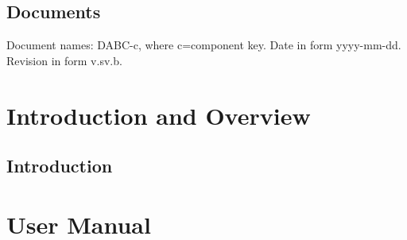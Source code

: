 \documentclass{dabcclass}
\begin{document}
 \cleardoublepage
\thispagestyle{empty} \tableofcontents \thispagestyle{empty} \cleardoublepage
{}

 \cleardoublepage
 \cleardoublepage
 \cleardoublepage

\setcounter{chapter}{0}
\chapter{Documents}
Document names: DABC-c, where c=component key. Date in form yyyy-mm-dd.
Revision in form v.sv.b.\\

%



%
%

%
%
\cleardoublepage
\part{Introduction and Overview}
\chapter{Introduction}
 \cleardoublepage
\part{User Manual}
 \cleardoublepage
\end{document}
